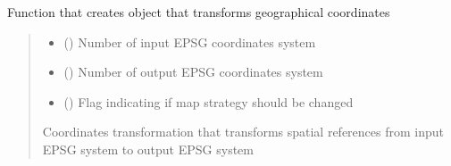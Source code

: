 \documentclass[letterpaper,10pt,english]{sphinxmanual}
\begin{document}
\begin{fulllineitems}
\label{\detokenize{pcm_utilities:pcm_utilities.create_coords_transform}}
\pysigstartsignatures
{}
\pysigstopsignatures
\sphinxAtStartPar
Function that creates object that transforms geographical coordinates
\begin{quote}\begin{description}
\begin{itemize}
\item {} 
\sphinxAtStartPar
{} () \textendash{} Number of input EPSG coordinates system

\item {} 
\sphinxAtStartPar
{} () \textendash{} Number of output EPSG coordinates system

\item {} 
\sphinxAtStartPar
{} () \textendash{} Flag indicating if map strategy should be changed

\end{itemize}

\sphinxAtStartPar
{}

\sphinxAtStartPar
Coordinates transformation that transforms spatial references from input EPSG system to output EPSG system

\end{description}\end{quote}

\end{fulllineitems}

\end{document}
